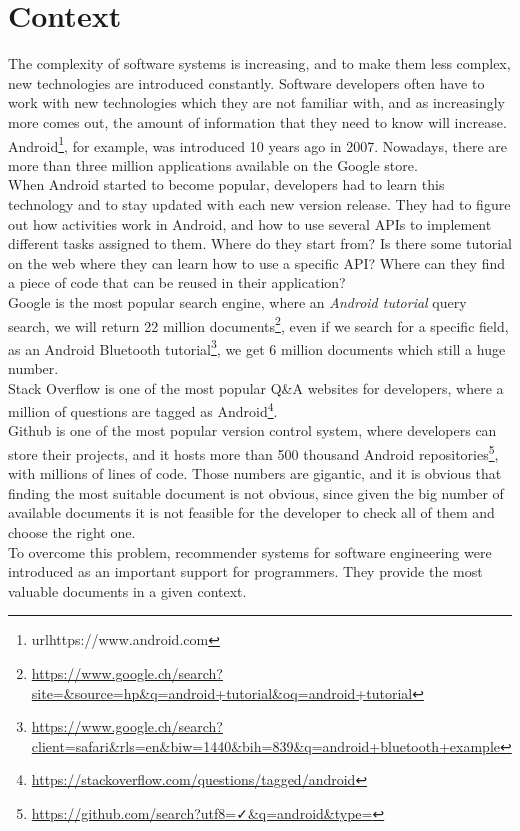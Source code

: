 \documentclass[12pt,mscthesis]{usiinfthesis}
\begin{document}
	\section{Context}
	The complexity of software systems is increasing, and to make them less complex, new technologies are introduced constantly. Software developers often have to work with new technologies which they are not familiar with, and as increasingly more comes out, the amount of information that they need to know will increase. Android\footnote{url{https://www.android.com}}, for example, was introduced 10 years ago in 2007. Nowadays, there are more than three million applications available on the Google store. \\
	When Android started to become popular, developers had to learn this technology and to stay updated with each new version release. 
	They had to figure out how activities work in Android, and how to use several APIs to implement different tasks assigned to them. Where do they start from? Is there some tutorial on the web where they can learn how to use a specific API? Where can they find a piece of code that can be reused in their application? \\
	Google is the most popular search engine, where an \emph{Android tutorial} query search, we will return 22 million documents\footnote{\url{https://www.google.ch/search?site=&source=hp&q=android+tutorial&oq=android+tutorial}}, even if we search for a specific field, as an Android Bluetooth tutorial\footnote{\url{https://www.google.ch/search?client=safari&rls=en&biw=1440&bih=839&q=android+bluetooth+example}}, we get 6 million documents which still a huge number.\\
	Stack Overflow is one of the most popular Q\&A websites for developers, where a million of questions are tagged as Android\footnote{\url{https://stackoverflow.com/questions/tagged/android}}. \\
	Github is one of the most popular version control system, where developers can store their projects, and it hosts more than 500 thousand Android repositories\footnote{\url{https://github.com/search?utf8=✓&q=android&type=}}, with millions of lines of code. Those numbers are gigantic, and it is obvious that finding the most suitable document is not obvious, since given the big number of available documents it is not feasible for the developer to check all of them and choose the right one.\\
	To overcome this problem, recommender systems for software engineering were introduced as an important support for programmers. They provide the most valuable documents in a given context.\\
\end{document}
